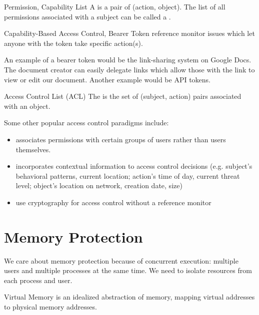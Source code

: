 \documentclass[code]{amznotes}
\begin{document}
\begin{dfnbox}{Permission, Capability List}{}
    A  is a pair of (action, object). The list of all permissions associated with a subject can be called a .
\end{dfnbox}

\begin{dfnbox}{Capability-Based Access Control, Bearer Token}{}
     reference monitor issues  which let anyone with the token take specific action(s).
\end{dfnbox}

An example of a bearer token would be the link-sharing system on Google Docs. The document creator can easily delegate links which allow those with the link to view or edit our document. Another example would be API tokens.

\begin{dfnbox}{Access Control List (ACL)}{}
    The  is the set of (subject, action) pairs associated with an object.
\end{dfnbox}

Some other popular access control paradigms include:
\begin{itemize}
    \item {} associates permissions with certain groups of users rather than users themselves.
    \item {} incorporates contextual information to access control decisions (e.g. subject's behavioral patterns, current location; action's time of day, current threat level; object's location on network, creation date, size)
    \item {} use cryptography for access control without a reference monitor
\end{itemize}

\section{Memory Protection}
We care about memory protection because of concurrent execution: multiple users and multiple processes at the same time. We need to isolate resources from each process and user.

\begin{dfnbox}{Virtual Memory}{}
     is an idealized abstraction of memory, mapping virtual addresses to physical memory addresses.
\end{dfnbox}
\end{document}
